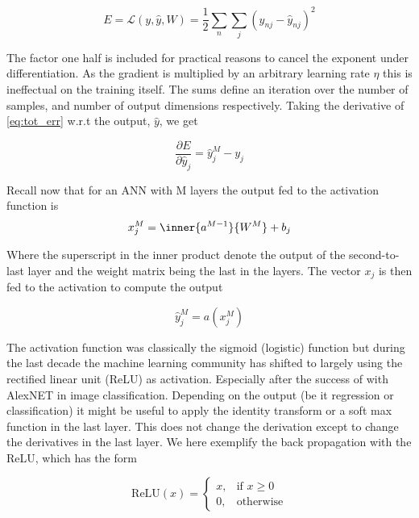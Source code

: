 \begin{equation}\label{eq:tot_err}
	E = \mathcal{L}(y, \hat{y}, W) = \frac{1}{2}\sum_n \sum_j (y_{nj} - \hat{y}_{nj})^2
\end{equation}

\noindent The factor one half is included for practical reasons to cancel the exponent under differentiation. As the gradient is multiplied by an arbitrary learning rate $\eta$ this is ineffectual on the training itself. The sums define an iteration over the number of samples, and number of output dimensions respectively. Taking the derivative of \ref{eq:tot_err} w.r.t the output, $\hat{y}$, we get 

\begin{equation}\label{eq:err_grad}
	\frac{\partial E}{\partial \hat{y}_{j}} = \hat{y}_{j}^M -  y_{j} 
\end{equation}

\noindent Recall now that for an ANN with M layers the output fed to the activation function is 
\begin{equation}\label{eq:fwd_multi}
	x_{j}^M = \inner{a^{M-1}}{W^M} + b_j
\end{equation}

\noindent Where the superscript in the inner product denote the output of the second-to-last layer and the weight matrix being the last in the layers. The vector $x_{j}$ is then fed to the activation to compute the output 

\begin{equation}
\hat{y}_{j}^M = a(x_{j}^M) 
\end{equation}

\noindent  The activation function was classically the sigmoid (logistic) function but during the last decade the machine learning community has shifted to largely using the rectified linear unit (ReLU) as activation. Especially after the success of \citet{Krizhevsky2012} with AlexNET in image classification. Depending on the output (be it regression or classification) it might be useful to apply the identity transform or a soft max function in the last layer. This does not change the derivation except to change the derivatives in the last layer. We here exemplify the back propagation with the ReLU, which has the form 

\begin{equation}\label{eq:relu}
	\text{ReLU} (x) = \begin{cases}
	x, & \text{if } x \geq 0 \\
	0,  & \text{otherwise} 
	\end{cases}
\end{equation}

